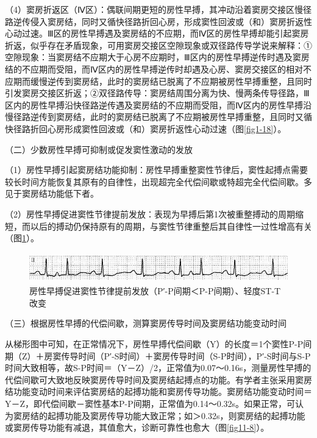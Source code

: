 （4）窦房折返区（Ⅳ区）：偶联间期更短的房性早搏，其冲动沿着窦房交接区慢径路逆传侵入窦房结，同时又循快径路折回心房，形成窦性回波或（和）窦房折返性心动过速。Ⅲ区的房性早搏遇及窦房结的不应期，而Ⅳ区的房性早搏却能引起窦房折返，似乎存在矛盾现象，可用窦房交接区空隙现象或双径路传导学说来解释：①空隙现象：当窦房结不应期大于心房不应期时，Ⅲ区内的房性早搏逆传时遇及窦房结的不应期而受阻，而Ⅳ区内的房性早搏逆传时却遇及心房、窦房交接区的相对不应期而缓慢逆传到窦房结，此时的窦房结已脱离了不应期被房性早搏重整，且同时引发窦房交接区折返；②双径路传导：窦房结周围分离为快、慢两条传导径路，Ⅲ区内的房性早搏沿快径路逆传遇及窦房结的不应期而受阻，而Ⅳ区内的房性早搏沿慢径路逆传到窦房结，此时的窦房结已脱离了不应期被房性早搏重整，且同时又循快径路折回心房形成窦性回波或（和）窦房折返性心动过速（图\ref{fig1-18}）。

（二）少数房性早搏可抑制或促发窦性激动的发放

（1）房性早搏引起窦房结功能抑制：房性早搏重整窦性节律后，窦性起搏点需要较长时间方能恢复其原有的自律性，出现超完全代偿间歇或特超完全代偿间歇。多见于窦房结功能低下者。

（2）房性早搏促进窦性节律提前发放：表现为早搏后第1次被重整搏动的周期缩短，而以后的搏动仍保持原有的周期，与窦性节律重整后其自律性一过性增高有关（图\ref{fig11-7}）。

\begin{figure}[!htbp]
 \centering
 \includegraphics[width=5.58333in,height=0.51042in]{./images/Image00159.jpg}
 \captionsetup{justification=centering}
 \caption{房性早搏促进窦性节律提前发放（P′-P间期＜P-P间期）、轻度ST-T改变}
 \label{fig11-7}
  \end{figure} 

（三）根据房性早搏的代偿间歇，测算窦房传导时间及窦房结功能变动时间

从梯形图中可知，在正常情况下，房性早搏代偿间歇（Y）的长度＝1个窦性P-P间期（Z）＋房窦传导时间（P′-S时间）＋窦房传导时间（S-P时间），P′-S时间与S-P时间大致相等，故S-P时间＝（Y－Z）/2，正常值为0.07～0.16s，测量房性早搏的代偿间歇可大致地反映窦房传导时间及窦房结起搏点的功能。有学者主张采用窦房结功能变动时间来评估窦房结的起搏功能和窦房传导功能。窦房结功能变动时间＝Y－Z，即代偿间歇－窦性基本P-P间期，正常值为0.14～0.32s。如果正常，可认为窦房结的起搏功能及窦房传导功能大致正常；如＞0.32s，则窦房结的起搏功能或窦房传导功能有减退，其值愈大，诊断可靠性也愈大（图\ref{fig11-8}）。

